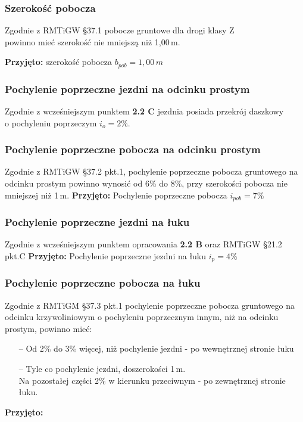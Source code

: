 \documentclass[12pt]{article}
\begin{document}
        \subsubsection{Szerokość pobocza}
        Zgodnie z RMTiGW §37.1 pobocze gruntowe dla drogi klasy Z \\
        powinno mieć szerokość nie mniejszą niż 1,00\,m.
        \medskip

        \textbf{Przyjęto:} szerokość pobocza \(b_{pob} = 1,00\,m\)

        \subsubsection{Pochylenie poprzeczne jezdni na odcinku prostym}
        Zgodnie z wcześniejszym punktem \textbf{2.2 C} jezdnia posiada przekrój daszkowy
        \\o pochyleniu poprzeczym \( i_{o} = 2\% \).

        \subsubsection{Pochylenie poprzeczne pobocza na odcinku prostym}
            Zgodnie z RMTiGW §37.2 pkt.1, pochylenie poprzeczne pobocza gruntowego na odcinku prostym
            powinno wynosić od 6\% do 8\%, przy szerokości pobocza nie mniejszej niż 1\,m.
            \medskip
            \textbf{Przyjęto:} Pochylenie poprzeczne pobocza \(i_{pob} = 7\%\)
        
        \subsubsection{Pochylenie poprzeczne jezdni na łuku}
            Zgodnie z wcześniejszym punktem opracowania \textbf{2.2 B} oraz RMTiGW §21.2 pkt.C
            \textbf{Przyjęto:} Pochylenie poprzeczne jezdni na łuku \(i_{p} = 4\% \)

        \subsubsection{Pochylenie poprzeczne pobocza na łuku}
            Zgodnie z RMTiGM §37.3 pkt.1 pochylenie poprzeczne pobocza gruntowego
            na odcinku krzywoliniowym o pochyleniu poprzecznym innym, niż na odcinku prostym, powinno mieć:
            \begin{itemize}[nolistsep]
                \item[--] Od 2\% do 3\% więcej, niż pochylenie jezdni - po wewnętrznej stronie łuku
                \item[--] Tyle co pochylenie jezdni, doszerokości 1\,m.\\
                          Na pozostałej części 2\% w kierunku przeciwnym - po zewnętrznej stronie łuku. 
            \end{itemize}
            \newpage
            \textbf{Przyjęto:}
\end{document}
